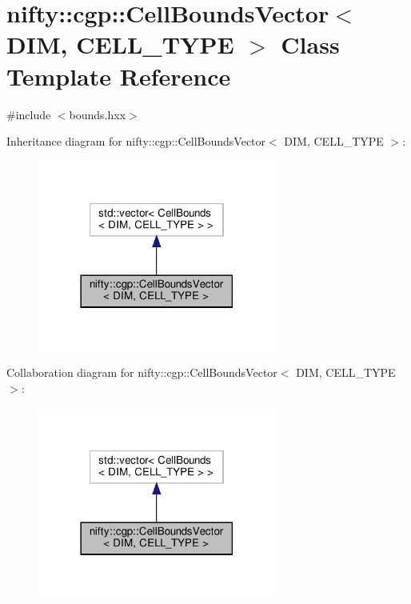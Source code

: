 \hypertarget{classnifty_1_1cgp_1_1CellBoundsVector}{}\section{nifty\+:\+:cgp\+:\+:Cell\+Bounds\+Vector$<$ D\+IM, C\+E\+L\+L\+\_\+\+T\+Y\+PE $>$ Class Template Reference}
\label{classnifty_1_1cgp_1_1CellBoundsVector}


{\ttfamily \#include $<$bounds.\+hxx$>$}



Inheritance diagram for nifty\+:\+:cgp\+:\+:Cell\+Bounds\+Vector$<$ D\+IM, C\+E\+L\+L\+\_\+\+T\+Y\+PE $>$\+:
\nopagebreak
\begin{figure}[H]
\begin{center}
\leavevmode
\includegraphics[width=222pt]{classnifty_1_1cgp_1_1CellBoundsVector__inherit__graph}
\end{center}
\end{figure}


Collaboration diagram for nifty\+:\+:cgp\+:\+:Cell\+Bounds\+Vector$<$ D\+IM, C\+E\+L\+L\+\_\+\+T\+Y\+PE $>$\+:
\nopagebreak
\begin{figure}[H]
\begin{center}
\leavevmode
\includegraphics[width=222pt]{classnifty_1_1cgp_1_1CellBoundsVector__coll__graph}
\end{center}
\end{figure}
